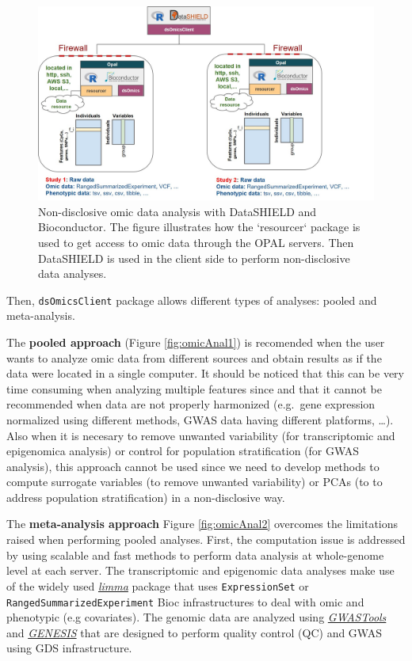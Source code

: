 \documentclass[]{article}
\begin{document}
\begin{figure}

{\centering \includegraphics[width=1\linewidth]{fig/dsOmics_A} 

}

\caption{Non-disclosive omic data analysis with DataSHIELD and Bioconductor. The figure illustrates how the `resourcer` package is used to get access to omic data through the OPAL servers. Then DataSHIELD is used in the client side to perform non-disclosive data analyses.}\label{fig:opalOmic}
\end{figure}

Then, \texttt{dsOmicsClient} package allows different types of analyses:
pooled and meta-analysis.

The \textbf{pooled approach} (Figure \ref{fig:omicAnal1}) is recomended
when the user wants to analyze omic data from different sources and
obtain results as if the data were located in a single computer. It
should be noticed that this can be very time consuming when analyzing
multiple features since and that it cannot be recommended when data are
not properly harmonized (e.g.~gene expression normalized using different
methods, GWAS data having different platforms, \ldots). Also when it is
necesary to remove unwanted variability (for transcriptomic and
epigenomica analysis) or control for population stratification (for GWAS
analysis), this approach cannot be used since we need to develop methods
to compute surrogate variables (to remove unwanted variability) or PCAs
(to to address population stratification) in a non-disclosive way.

The \textbf{meta-analysis approach} Figure \ref{fig:omicAnal2} overcomes
the limitations raised when performing pooled analyses. First, the
computation issue is addressed by using scalable and fast methods to
perform data analysis at whole-genome level at each server. The
transcriptomic and epigenomic data analyses make use of the widely used
\emph{\href{https://bioconductor.org/packages/3.9/limma}{limma}} package
that uses \texttt{ExpressionSet} or \texttt{RangedSummarizedExperiment}
Bioc infrastructures to deal with omic and phenotypic (e.g covariates).
The genomic data are analyzed using
\emph{\href{https://bioconductor.org/packages/3.9/GWASTools}{GWASTools}}
and \emph{\href{https://bioconductor.org/packages/3.9/GENESIS}{GENESIS}}
that are designed to perform quality control (QC) and GWAS using GDS
infrastructure.
\end{document}
